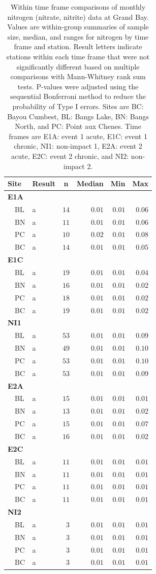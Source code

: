 \documentclass[letterpaper,12pt]{article}\usepackage[]{graphicx}\usepackage[]{color}
\begin{document}
\clearpage

\begin{table}[!tbp]
\caption{Within time frame comparisons of monthly nitrogen (nitrate, nitrite) data at Grand Bay.  Values are within-group summaries of sample size, median, and ranges for nitrogen by time frame and station.  Result letters indicate stations within each time frame that were not significantly different based on multiple comparisons with Mann-Whitney rank sum tests.  P-values were adjusted using the sequential Bonferroni method to reduce the probability of Type I errors. Sites are BC: Bayou Cumbest, BL: Bangs Lake, BN: Bangs North, and PC: Point aux Chenes.  Time frames are E1A: event 1 acute, E1C: event 1 chronic, NI1: non-impact 1, E2A: event 2 acute, E2C: event 2 chronic, and NI2: non-impact 2.\label{tab:tntab2}} 
\begin{center}
\begin{tabular}{llrrrr}
\hline\hline
\multicolumn{1}{l}{Site}&\multicolumn{1}{c}{Result}&\multicolumn{1}{c}{n}&\multicolumn{1}{c}{Median}&\multicolumn{1}{c}{Min}&\multicolumn{1}{c}{Max}\tabularnewline
\hline
{\bfseries E1A}&&&&&\tabularnewline
~~BL&a&$14$&$0.01$&$0.01$&$0.06$\tabularnewline
~~BN&a&$11$&$0.01$&$0.01$&$0.06$\tabularnewline
~~PC&a&$10$&$0.02$&$0.01$&$0.08$\tabularnewline
~~BC&a&$14$&$0.01$&$0.01$&$0.05$\tabularnewline
\hline
{\bfseries E1C}&&&&&\tabularnewline
~~BL&a&$19$&$0.01$&$0.01$&$0.04$\tabularnewline
~~BN&a&$16$&$0.01$&$0.01$&$0.02$\tabularnewline
~~PC&a&$18$&$0.01$&$0.01$&$0.02$\tabularnewline
~~BC&a&$19$&$0.01$&$0.01$&$0.02$\tabularnewline
\hline
{\bfseries NI1}&&&&&\tabularnewline
~~BL&a&$53$&$0.01$&$0.01$&$0.09$\tabularnewline
~~BN&a&$49$&$0.01$&$0.01$&$0.10$\tabularnewline
~~PC&a&$53$&$0.01$&$0.01$&$0.10$\tabularnewline
~~BC&a&$53$&$0.01$&$0.01$&$0.09$\tabularnewline
\hline
{\bfseries E2A}&&&&&\tabularnewline
~~BL&a&$15$&$0.01$&$0.01$&$0.01$\tabularnewline
~~BN&a&$13$&$0.01$&$0.01$&$0.02$\tabularnewline
~~PC&a&$15$&$0.01$&$0.01$&$0.07$\tabularnewline
~~BC&a&$16$&$0.01$&$0.01$&$0.02$\tabularnewline
\hline
{\bfseries E2C}&&&&&\tabularnewline
~~BL&a&$11$&$0.01$&$0.01$&$0.01$\tabularnewline
~~BN&a&$11$&$0.01$&$0.01$&$0.01$\tabularnewline
~~PC&a&$11$&$0.01$&$0.01$&$0.01$\tabularnewline
~~BC&a&$11$&$0.01$&$0.01$&$0.01$\tabularnewline
\hline
{\bfseries NI2}&&&&&\tabularnewline
~~BL&a&$ 3$&$0.01$&$0.01$&$0.01$\tabularnewline
~~BN&a&$ 3$&$0.01$&$0.01$&$0.01$\tabularnewline
~~PC&a&$ 3$&$0.01$&$0.01$&$0.01$\tabularnewline
~~BC&a&$ 3$&$0.01$&$0.01$&$0.01$\tabularnewline
\hline
\end{tabular}\end{center}
\end{table}
\end{document}
